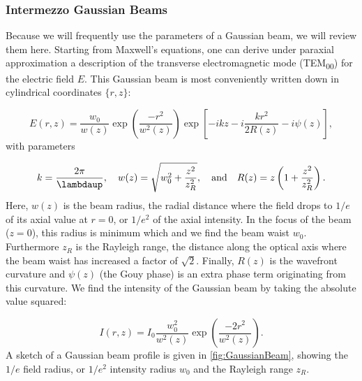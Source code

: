 \mbox{}\par
\begin{mdframed}
    \subsubsection*{Intermezzo Gaussian Beams}\label{sec:GaussianBeams}
    
    Because we will frequently use the parameters of a Gaussian beam, we will review them here. 
    Starting from Maxwell's equations, one can derive under paraxial approximation a description of the transverse electromagnetic mode (TEM\textsubscript{00}) \cite{Leeuwen2017} for the electric field $E$.
    This Gaussian beam is most conveniently written down in cylindrical coordinates $\{r,z\}$:
    
    \begin{equation}\label{eq:GaussianBeam}
    	E(r,z) = \frac{w_0}{w(z)} \exp{\left(\frac{-r^2}{w^2(z)}\right)} \exp{\left[-ikz-i\frac{kr^2}{2R(z)} - i\psi(z)\right]},
    \end{equation}
    with parameters
    
    \begin{equation}\label{eq:GaussianBeamParameters}
    	k = \frac{2\pi}{\lambdaup}, \quad 
    	w(z) = \sqrt{w_0^2 + \frac{z^2}{z_R^2}}, \quad \text{and} \quad
    	R(z) = z \left(1 + \frac{z^2}{z_R^2}\right).
    \end{equation}
    Here, $w(z)$ is the beam radius, the radial distance where the field drops to $1/e$ of its axial value at $r=0$, or $1/e^2$ of the axial intensity.
    In the focus of the beam ($z=0$), this radius is minimum which and we find the beam waist $w_0$.
    Furthermore $z_R$ is the Rayleigh range, the distance along the optical axis where the beam waist has increased a factor of $\sqrt{2}$.
    Finally, $R(z)$ is the wavefront curvature and $\psi(z)$ (the Gouy phase) is an extra phase term originating from this curvature. 
    We find the intensity of the Gaussian beam by taking the absolute value squared:
    
    \begin{equation}\label{eq:GaussianBeamIntensity}
    	I(r,z) = I_0 \frac{w_0^2}{w^2(z)} \exp{\left(\frac{-2r^2}{w^2(z)}\right)}.
    \end{equation}
    A sketch of a Gaussian beam profile is given in \cref{fig:GaussianBeam}, showing the $1/e$ field radius, or $1/e^2$ intensity radius $w_0$ and the Rayleigh range $z_R$. 
    

\end{mdframed}
